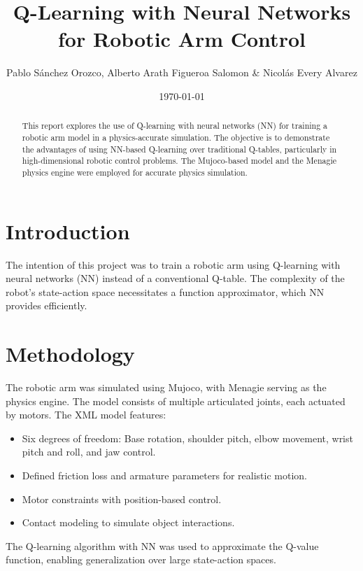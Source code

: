 \documentclass{article}
\title{Q-Learning with Neural Networks for Robotic Arm Control}
\author{Pablo Sánchez Orozco, Alberto Arath Figueroa Salomon & Nicolás Every Alvarez }
\date{\today}
\begin{document}
\maketitle

\begin{abstract}
This report explores the use of Q-learning with neural networks (NN) for training a robotic arm model in a physics-accurate simulation. The objective is to demonstrate the advantages of using NN-based Q-learning over traditional Q-tables, particularly in high-dimensional robotic control problems. The Mujoco-based model and the Menagie physics engine were employed for accurate physics simulation.
\end{abstract}

\section{Introduction}
The intention of this project was to train a robotic arm using Q-learning with neural networks (NN) instead of a conventional Q-table. The complexity of the robot's state-action space necessitates a function approximator, which NN provides efficiently. 

\section{Methodology}
The robotic arm was simulated using Mujoco, with Menagie serving as the physics engine. The model consists of multiple articulated joints, each actuated by motors. The XML model features:
\begin{itemize}
    \item Six degrees of freedom: Base rotation, shoulder pitch, elbow movement, wrist pitch and roll, and jaw control.
    \item Defined friction loss and armature parameters for realistic motion.
    \item Motor constraints with position-based control.
    \item Contact modeling to simulate object interactions.
\end{itemize}

The Q-learning algorithm with NN was used to approximate the Q-value function, enabling generalization over large state-action spaces.
\end{document}
